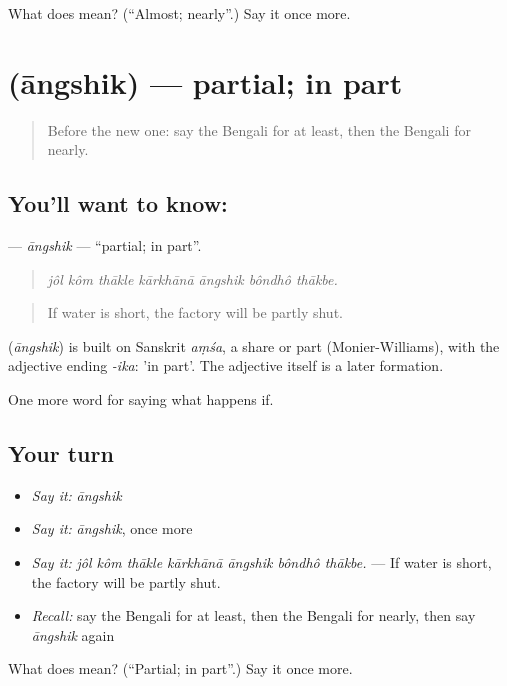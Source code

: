 \begin{tcolorbox}[breakable,colback=teal!4,colframe=teal!35!black,title={Before you move on}]
What does  mean? (\textquotedblleft{}Almost; nearly\textquotedblright{}.) Say it once more.
\end{tcolorbox}
\section[\texorpdfstring{\bn{আংশিক} (āngshik)}{আংশিক (āngshik)}]{ (āngshik) — partial; in part}

\label{lesson:BN-C373-angshik}



\begin{quote}
Before the new one: say the Bengali for at least, then the Bengali for nearly.
\end{quote}

\subsection*{You'll want to know: }
\textbf{} — \emph{āngshik} — \textquotedblleft{}partial; in part\textquotedblright{}.

\begin{quote}
      
\end{quote}

\begin{quote}
\emph{jôl kôm thākle kārkhānā āngshik bôndhô thākbe.}
\end{quote}

\begin{quote}
If water is short, the factory will be partly shut.
\end{quote}

\begin{cousinweb}
\textbf{} (\emph{āngshik}) is built on Sanskrit \emph{aṃśa}, a share or part (Monier-Williams), with the adjective ending \emph{-ika}: 'in part'. The adjective itself is a later formation.
\end{cousinweb}

\begin{grammarlens}[title={What you've built}]
One more word for saying what happens if.
\end{grammarlens}

\subsection*{Your turn}
\begin{itemize}
\raggedright
  \item \emph{Say it:} \emph{āngshik}
  \item \emph{Say it:} \emph{āngshik}, once more
  \item \emph{Say it:} \emph{jôl kôm thākle kārkhānā āngshik bôndhô thākbe.} — If water is short, the factory will be partly shut.
  \item \emph{Recall:} say the Bengali for at least, then the Bengali for nearly, then say \emph{āngshik} again
\end{itemize}

\begin{tcolorbox}[breakable,colback=teal!4,colframe=teal!35!black,title={Before you move on}]
What does  mean? (\textquotedblleft{}Partial; in part\textquotedblright{}.) Say it once more.
\end{tcolorbox}
